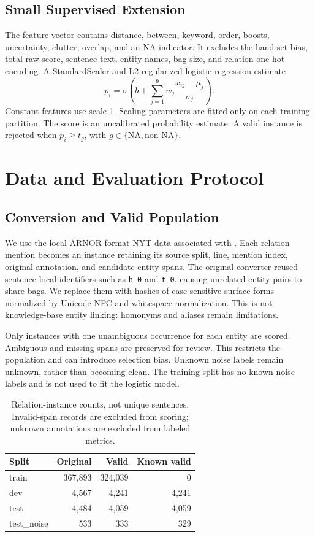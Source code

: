 \documentclass[11pt]{article}
\begin{document}
\subsection{Small Supervised Extension}
The feature vector contains distance, between, keyword, order, boosts, uncertainty, clutter, overlap, and an NA indicator. It excludes the hand-set bias, total raw score, sentence text, entity names, bag size, and relation one-hot encoding. A StandardScaler and L2-regularized logistic regression estimate
\[
p_i=\sigma\left(b+\sum_{j=1}^{9}w_j\frac{x_{ij}-\mu_j}{\sigma_j}\right).
\]
Constant features use scale 1. Scaling parameters are fitted only on each training partition. The score is an uncalibrated probability estimate. A valid instance is rejected when $p_i\geq t_g$, with $g\in\{\mathrm{NA},\mathrm{non\mbox{-}NA}\}$.

\section{Data and Evaluation Protocol}
\subsection{Conversion and Valid Population}
We use the local ARNOR-format NYT data associated with \citet{jia-etal-2019-arnor}. Each relation mention becomes an instance retaining its source split, line, mention index, original annotation, and candidate entity spans. The original converter reused sentence-local identifiers such as \texttt{h\_0} and \texttt{t\_0}, causing unrelated entity pairs to share bags. We replace them with hashes of case-sensitive surface forms normalized by Unicode NFC and whitespace normalization. This is not knowledge-base entity linking: homonyms and aliases remain limitations.

Only instances with one unambiguous occurrence for each entity are scored. Ambiguous and missing spans are preserved for review. This restricts the population and can introduce selection bias. Unknown noise labels remain unknown, rather than becoming clean. The training split has no known noise labels and is not used to fit the logistic model.

\begin{table}[t]
\centering\small
\begin{tabular}{lrrr}\toprule
Split & Original & Valid & Known valid\\\midrule
train & 367,893 & 324,039 & 0\\
dev & 4,567 & 4,241 & 4,241\\
test & 4,484 & 4,059 & 4,059\\
test\_noise & 533 & 333 & 329\\\bottomrule
\end{tabular}
\caption{Relation-instance counts, not unique sentences. Invalid-span records are excluded from scoring; unknown annotations are excluded from labeled metrics.}\label{tab:data}
\end{table}
\end{document}
